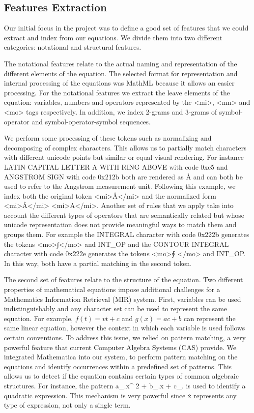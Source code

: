 \documentclass{sig-alternate}
\begin{document}
\subsection{Features Extraction}
Our initial focus in the project was to define a good set of features that we could extract and index from our equations. We divide them into two different categories: notational and structural features.

The notational features relate to the actual naming and representation of the different elements of the equation. The selected format for representation and internal processing of the equations was MathML because it allows an easier processing. For the notational features we extract the leave elements of the equation: variables, numbers and operators represented by the <mi>, <mn> and <mo> tags respectively. In addition, we index 2-grams and 3-grams of symbol-operator and symbol-operator-symbol sequences.

We perform some processing of these tokens such as normalizing and decomposing of complex characters. This allows us to partially match characters with different unicode points but similar or equal visual rendering. For instance LATIN CAPITAL LETTER A WITH RING ABOVE with code 0xc5 and ANGSTROM SIGN with code 0x212b both are rendered as \r{A} and can both be used to refer to the Angstrom measurement unit. Following this example, we index both the original token <mi>\r{A}</mi> and the normalized form <mi>\r{A}</mi> <mi>A</mi>. Another set of rules that we apply take into account the different types of operators that are semantically related but whose unicode representation does not provide meaningful ways to match them and groups them. For example the INTEGRAL character with code 0x222b generates the tokens <mo>{\unicodefont ∫}</mo> and INT\_OP and the CONTOUR INTEGRAL character with code 0x222e generates the tokens <mo>{\unicodefont ∮} </mo> and INT\_OP. In this way, both have a partial matching in the second token.

The second set of features relate to the structure of the equation. Two different properties of mathematical equations impose additional challenges for a Mathematics Information Retrieval (MIR) system. First, variables can be used indistinguishably and any character set can be used to represent the same equation. For example, $f(t) = vt + c $ and $g(x) = ac + b$ can represent the same linear equation, however the context in which each variable is used follows certain conventions. To address this issue, we relied on pattern matching, a very powerful feature that current Computer Algebra Systems (CAS) provide. We integrated Mathematica into our system, to perform pattern matching on the equations and identify occurrences within a predefined set of patterns. This allows us to detect if the equation contains certain types of common algebraic structures. For instance, the pattern {\codefont a\_.x\^{} 2 + b\_.x + c\_.} is used to identify a quadratic expression. This mechanism is very powerful since \.x represents any type of expression, not only a single term. 
\end{document}

